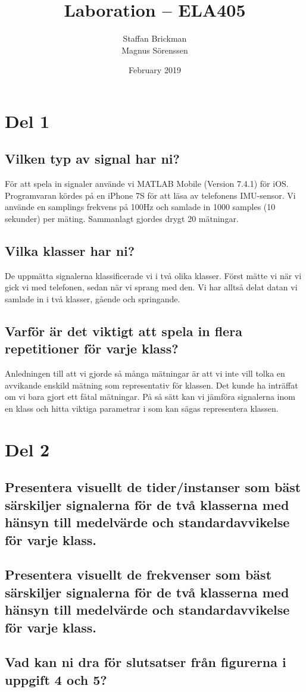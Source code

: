 \documentclass{article}
\title{Laboration – ELA405}
\author{Staffan Brickman \\ Magnus Sörenssen}
\date{February 2019}
\begin{document}
\maketitle

\section{Del 1}
\subsection{Vilken typ av signal har ni?}
För att spela in signaler använde vi MATLAB Mobile (Version 7.4.1) för iOS. Programvaran kördes på en iPhone 7S för att läsa av telefonens IMU-sensor. Vi använde en samplings frekvens på 100Hz och samlade in 1000 samples (10 sekunder) per mäting. Sammanlagt gjordes drygt 20 mätningar.
\subsection{Vilka klasser har ni?}
De uppmätta signalerna klassificerade vi i två olika klasser. Först mätte vi när vi gick vi med telefonen, sedan när vi sprang med den. Vi har alltså delat datan vi samlade in i två klasser, gående och springande.
\subsection{Varför är det viktigt att spela in flera repetitioner för varje klass?}
Anledningen till att vi gjorde så många mätningar är att vi inte vill tolka en avvikande enskild mätning som representativ för klassen. Det kunde ha inträffat om vi bara gjort ett fåtal mätningar. På så sätt kan vi jämföra signalerna inom en klass och hitta viktiga parametrar i som kan sägas representera klassen.
\newpage
\section{Del 2}
\subsection{Presentera visuellt de tider/instanser som bäst särskiljer signalerna för de två klasserna med hänsyn till medelvärde och standardavvikelse för varje klass.}
\subsection{Presentera visuellt de frekvenser som bäst särskiljer signalerna för de två klasserna med hänsyn till medelvärde och standardavvikelse för varje klass.}
\subsection{Vad kan ni dra för slutsatser från figurerna i uppgift 4 och 5?}
\end{document}
